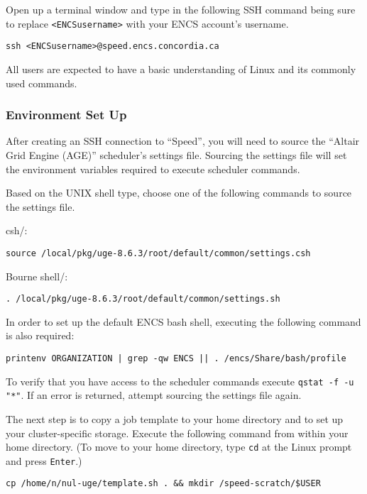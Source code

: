 \documentclass{easychair}
\begin{document}
Open up a terminal window and type in the following SSH command being sure to replace
\verb!<ENCSusername>! with your ENCS account's username.

\begin{verbatim}
ssh <ENCSusername>@speed.encs.concordia.ca
\end{verbatim}

All users are expected to have a basic understanding of Linux and its 
commonly used commands. 

\subsubsection{Environment Set Up}
\label{sect:envsetup}

After creating an SSH connection to ``Speed'', you will need to source 
the ``Altair Grid Engine (AGE)'' scheduler's settings file. 
Sourcing the settings file will set the environment variables required to 
execute scheduler commands.

Based on the UNIX shell type, choose one of the following commands to source
the settings file. 

csh/:
\begin{verbatim}
source /local/pkg/uge-8.6.3/root/default/common/settings.csh 
\end{verbatim}

Bourne shell/:
\begin{verbatim}
. /local/pkg/uge-8.6.3/root/default/common/settings.sh 
\end{verbatim}

In order to set up the default ENCS bash shell, executing the following command 
is also required:
\begin{verbatim}
printenv ORGANIZATION | grep -qw ENCS || . /encs/Share/bash/profile 
\end{verbatim}

To verify that you have access to the scheduler commands execute 
\texttt{qstat -f -u "*"}. If an error is returned, attempt sourcing 
the settings file again.

The next step is to copy a job template to your home directory and to set up your
cluster-specific storage. Execute the following command from within your
home directory. (To move to your home directory, type \texttt{cd} at the Linux
prompt and press \texttt{Enter}.) 

\begin{verbatim}
cp /home/n/nul-uge/template.sh . && mkdir /speed-scratch/$USER
\end{verbatim}
\end{document}
